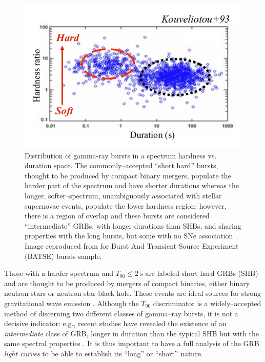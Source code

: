 \begin{figure}
\centering
\includegraphics[scale=0.80]{Images/GRB_short_long.png}
\caption{Distribution of gamma-ray bursts in a spectrum hardness vs. duration space. The commonly--accepted ``short hard'' bursts, thought to be produced by compact binary mergers, populate the harder part of the spectrum and have shorter durations whereas the longer, softer--spectrum, unambiguously associated with stellar supernovae events, populate the lower hardness region; however, there is a region of overlap and these bursts are considered ``intermediate'' GRBs, with longer durations than SHBs, and sharing properties with the long bursts, but some with no SNe association \cite{Postigo:2010ij}. Image reproduced from \cite{Nemiroff:1993vi} for Burst And Transient Source Experiment (BATSE) bursts sample.}
\label{GRB_short_long}
\end{figure}

Those with a harder spectrum and $T_{90} \leq \mathrm{2~s}$ are labeled short hard GRBs (\ac{SHB}) and are thought to be produced by mergers of compact binaries, either binary neutron stars or neutron star-black hole. These events are ideal sources for strong gravitational wave emission \cite{ACST94, Kiuchi:2010ze}. Although the $T_{90}$ discriminator is a widely--accepted method of discerning two different classes of gamma--ray bursts, it is not a decisive indicator: e.g., recent studies have revealed the existence of an \emph{intermediate} class of \ac{GRB}, longer in duration than the typical \ac{SHB} but with the same spectral properties \cite{Veres:2010yf, Ripa:2009xs, Norris:2011tt}. It is thus important to have a full analysis of the \ac{GRB} \emph{light curves} to be able to establish its ``long'' or ``short'' nature. 

